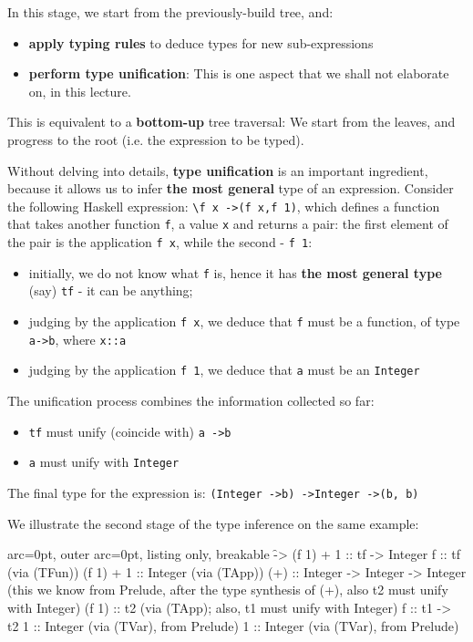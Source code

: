 In this stage, we start from the previously-build tree, and:
\begin{itemize}
	\item  \textbf{apply typing rules} to deduce types for new sub-expressions
	\item  \textbf{perform type unification}: This is one aspect that we shall not elaborate on, in this lecture. 
\end{itemize}

This is equivalent to a \textbf{bottom-up} tree traversal: We start from the leaves, and progress to the root (i.e. the expression to be typed).

Without delving into details, \textbf{type unification} is an important ingredient, because it allows us to infer \textbf{the most general} type of an expression. Consider the following Haskell expression: \texttt{\textbackslash f x -\textgreater  (f x,f 1)}, which defines a function that takes another function \texttt{f}, a value \texttt{x} and returns a pair: the first element of the pair is the application \texttt{f x}, while the second - \texttt{f 1}:
\begin{itemize}
	\item  initially, we do not know what \texttt{f} is, hence it has \textbf{the most general type} (say) \texttt{tf} - it can be anything;
	\item  judging by the application \texttt{f x}, we deduce that \texttt{f} must be a function, of type \texttt{a-\textgreater b}, where \texttt{x::a}
	\item  judging by the application \texttt{f 1}, we deduce that \texttt{a} must be an \texttt{Integer}
\end{itemize}
The unification process combines the information collected so far:
\begin{itemize}
	\item  \texttt{tf} must unify (coincide with) \texttt{a -\textgreater  b}
	\item  \texttt{a} must unify with \texttt{Integer}
\end{itemize}

The final type for the expression is: \texttt{(Integer -\textgreater  b) -\textgreater  Integer -\textgreater  (b, b)}

We illustrate the second stage of the type inference on the same example:


\begin{tcblisting}{ arc=0pt, outer arc=0pt, listing only, breakable}
\f -> (f 1) + 1 :: tf -> Integer
  f :: tf (via (TFun))
  (f 1) + 1 :: Integer (via (TApp))
    (+) :: Integer -> Integer -> Integer (this we know from Prelude, after the type synthesis of (+), also t2 must unify with Integer)
    (f 1) :: t2 (via (TApp); also, t1 must unify with Integer)
       f :: t1 -> t2
       1 :: Integer (via (TVar), from Prelude)
    1 :: Integer (via (TVar), from Prelude)

\end{tcblisting}


